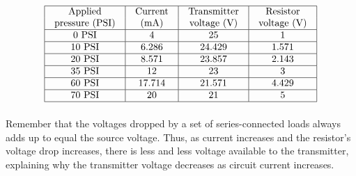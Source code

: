 $$\vbox{\offinterlineskip
\halign{\strut
\vrule \quad\hfil # \ \hfil & 
\vrule \quad\hfil # \ \hfil & 
\vrule \quad\hfil # \ \hfil & 
\vrule \quad\hfil # \ \hfil \vrule \cr
\noalign{\hrule}
%
Applied & Current & Transmitter & Resistor \cr
%
pressure (PSI) & (mA) & voltage (V) & voltage (V) \cr
%
\noalign{\hrule}
%
0 PSI & 4 & 25 & 1 \cr
%
\noalign{\hrule}
%
10 PSI & 6.286 & 24.429 & 1.571 \cr
%
\noalign{\hrule}
%
20 PSI & 8.571 & 23.857 & 2.143 \cr
%
\noalign{\hrule}
%
35 PSI & 12 & 23 & 3 \cr
%
\noalign{\hrule}
%
60 PSI & 17.714 & 21.571 & 4.429 \cr
%
\noalign{\hrule}
%
70 PSI & 20 & 21 & 5 \cr
%
\noalign{\hrule}
} %
}$$ %

Remember that the voltages dropped by a set of series-connected loads always adds up to equal the source voltage.  Thus, as current increases and the resistor's voltage drop increases, there is less and less voltage available to the transmitter, explaining why the transmitter voltage decreases as circuit current increases.




